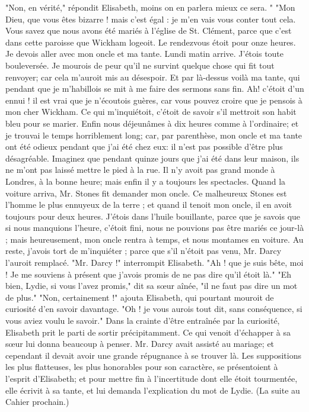 \setcounter{page}{125}
"Non, en vérité," répondit Elisabeth, moins on en parlera mieux ce sera. "
"Mon Dieu, que vous êtes bizarre ! mais c'est égal : je m'en vais vous conter tout cela. Vous savez que nous avons été mariés à l'église de St. Clément, parce que c'est dans cette paroisse que Wickham logeoit. Le rendezvous étoit pour onze heures. Je devois aller avec mon oncle et ma tante. Lundi matin arrive. J'étois toute bouleversée. Je mourois de peur qu'il ne survint quelque chose qui fit tout renvoyer; car cela m'auroit mis au désespoir. Et par là-dessus voilà ma tante, qui pendant que je m'habillois se mit à me faire des sermons sans fin. Ah! c'étoit d'un ennui ! il est vrai que je n'écoutois guères, car vous pouvez croire que je pensois à mon cher Wickham. Ce qui m'inquiétoit, c'étoit de savoir s'il mettroit son habit bleu pour se marier. Enfin nous déjeunâmes à dix heures comme à l'ordinaire; et je trouvai le temps horriblement long; car, par parenthèse, mon oncle et ma tante ont été odieux pendant que j'ai été chez eux: il n'est pas possible d'être plus désagréable. Imaginez que pendant quinze jours que j'ai été dans leur maison, ils ne m'ont pas laissé mettre le pied à la rue. Il n'y avoit pas grand monde à Londres, à la bonne heure;\setcounter{page}{126} mais enfin il y a toujours les spectacles. Quand la voiture arriva, Mr. Stones fit demander mon oncle. Ce malheureux Stones est l'homme le plus ennuyeux de la terre ; et quand il tenoit mon oncle, il en avoit toujours pour deux heures. J'étois dans l'huile bouillante, parce que je savois que si nous manquions l'heure, c'étoit fini, nous ne pouvions pas être mariés ce jour-là ; mais heureusement, mon oncle rentra à temps, et nous montames en voiture. Au reste, j'avois tort de m'inquiéter ; parce que s'il n'étoit pas venu, Mr. Darcy l'auroit remplacé.
"Mr. Darcy !" interrompit Elisabeth.
"Ah ! que je suis bête, moi ! Je me souviens à présent que j'avois promis de ne pas dire qu'il étoit là."
"Eh bien, Lydie, si vous l'avez promis," dit sa sœur aînée, "il ne faut pas dire un mot de plus."
"Non, certainement !" ajouta Elisabeth, qui pourtant mouroit de curiosité d'en savoir davantage.
"Oh ! je vous aurois tout dit, sans conséquence, si vous aviez voulu le savoir."
Dans la crainte d'être entraînée par la curiosité, Elisabeth prit le parti de sortir précipitamment. Ce qui venoit d'échapper à sa sœur lui donna beaucoup à penser. Mr.\setcounter{page}{127} Darcy avait assisté au mariage; et cependant il devait avoir une grande répugnance à se trouver là. Les suppositions les plus flatteuses, les plus honorables pour son caractère, se présentoient à l'esprit d'Elisabeth; et pour mettre fin à l'incertitude dont elle étoit tourmentée, elle écrivit à sa tante, et lui demanda l'explication du mot de Lydie.
(La suite au Cahier prochain.)
